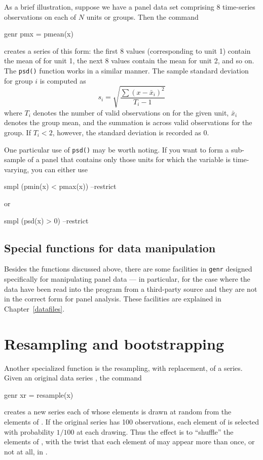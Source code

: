 As a brief illustration, suppose we have a panel data set comprising 8
time-series observations on each of $N$ units or groups.  Then the
command
%
\begin{code}
genr pmx = pmean(x)
\end{code}
%
creates a series of this form: the first 8 values (corresponding to
unit 1) contain the mean of  for unit 1, the next 8 values
contain the mean for unit 2, and so on.  The \texttt{psd()} function
works in a similar manner.  The sample standard deviation for group
$i$ is computed as
\[
s_i = \sqrt{\frac{\sum(x-\bar{x}_i)^2}{T_i-1}}
\]
where $T_i$ denotes the number of valid observations on 
for the given unit, $\bar{x}_i$ denotes the group mean, and the
summation is across valid observations for the group.  If $T_i < 2$,
however, the standard deviation is recorded as 0.

One particular use of \texttt{psd()} may be worth noting.  If you want
to form a sub-sample of a panel that contains only those units for
which the variable  is time-varying, you can either use 
%
\begin{code}
smpl (pmin(x) < pmax(x)) --restrict
\end{code}
or
%
\begin{code}
smpl (psd(x) > 0) --restrict
\end{code}

\subsection{Special functions for data manipulation}
\label{panel-manip}

Besides the functions discussed above, there are some facilities in
\texttt{genr} designed specifically for manipulating panel data --- in
particular, for the case where the data have been read into the
program from a third-party source and they are not in the correct
form for panel analysis.  These facilities are explained in
Chapter~\ref{datafiles}.


\section{Resampling and bootstrapping}
\label{sec:genr-resample}

Another specialized function is the resampling, with replacement, of a
series.  Given an original data series , the command
%
\begin{code}
genr xr = resample(x)
\end{code}
%
creates a new series each of whose elements is drawn at random from
the elements of .  If the original series has 100
observations, each element of  is selected with probability
$1/100$ at each drawing.  Thus the effect is to ``shuffle'' the
elements of , with the twist that each element of
 may appear more than once, or not at all, in .

